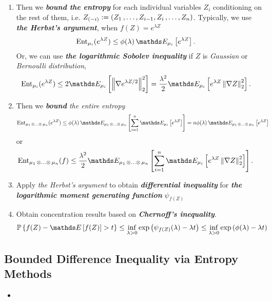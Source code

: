 \documentclass[11pt]{article}
\begin{document}
\begin{itemize}
\begin{remark}
\begin{enumerate}
\item Then we \emph{\textbf{bound the entropy}} for each individual variables $Z_i$ conditioning on the rest of them, i.e. $Z_{(-i)} := (Z_1 \,{,}\ldots{,}\, Z_{i-1}, Z_{i} \,{,}\ldots{,}\, Z_n)$.  Typically, we use \emph{\textbf{the Herbst's argument}}, when $f(Z) = e^{\lambda Z}$
\begin{align*}
\text{Ent}_{\mu_i}(e^{\lambda Z}) &\le \phi(\lambda)\, \E{\mu_i}{e^{\lambda Z}}.
\end{align*} Or, we can use \emph{\textbf{the logarithmic Sobolev inequality}} if $Z$ is \emph{Gaussian} or \emph{Bernoulli distribution}, 
\begin{align*}
\text{Ent}_{\mu_i}(e^{ \lambda Z}) &\le 2 \E{\mu_i}{\norm{\nabla e^{\lambda Z/2}}{2}^2} = \frac{\lambda^2}{2}\E{\mu_i}{e^{\lambda Z} \norm{\nabla Z}{2}^2}.
\end{align*}
\item Then we \emph{\textbf{bound} the entire entropy} 
\begin{align*}
\text{Ent}_{\mu_1 \xdotx{\otimes} \mu_n}(e^{\lambda Z}) &\le \phi(\lambda)\,\E{\mu_1 \xdotx{\otimes} \mu_n}{\sum_{i=1}^{n}\E{\mu_i}{e^{\lambda Z}}} = n \phi(\lambda)\,\E{\mu_1 \xdotx{\otimes} \mu_n}{e^{\lambda Z}}
\end{align*} or
\begin{align*}
\text{Ent}_{\mu_1 \xdotx{\otimes} \mu_n}(f) &\le  \frac{\lambda^2}{2}\E{\mu_1 \xdotx{\otimes} \mu_n}{\sum_{i=1}^{n}\E{\mu_i}{e^{\lambda Z} \norm{\nabla Z}{2}^2}}.
\end{align*}
\item Apply \emph{the Herbst's argument} to obtain \emph{\textbf{differential inequality}} for \emph{\textbf{the logarithmic moment generating function}} $\psi_{f(Z)}$

\item Obtain concentration results based on \textbf{\emph{Chernoff's inequality}}.
\begin{align*}
\bP\set{f(Z) - \E{}{f(Z)} > t} &\le \inf_{\lambda >0 }\exp\paren{\psi_{f(Z)}(\lambda) - \lambda t} \le \inf_{\lambda >0 }\exp\paren{\phi(\lambda) - \lambda t}
\end{align*}
\end{enumerate}
\end{remark}

  

\end{itemize}

\subsection{Bounded Difference Inequality via Entropy Methods}
\begin{itemize}
\item 
\end{itemize}
\end{document}
